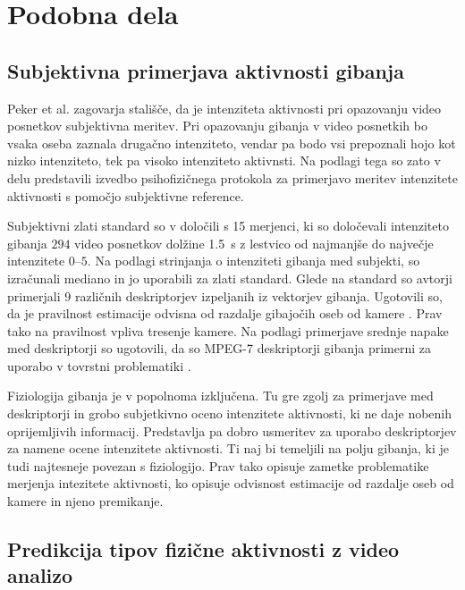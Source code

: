 \section{Podobna dela}\label{sec:podobna-dela}



\subsection{Subjektivna primerjava aktivnosti gibanja}\label{sec:subjektivna-primerjava}

Peker et al. \cite{peker2004framework} zagovarja stališče, da je intenziteta aktivnosti pri opazovanju video posnetkov subjektivna meritev. Pri opazovanju gibanja v video posnetkih bo vsaka oseba zaznala drugačno intenziteto, vendar pa bodo vsi prepoznali hojo kot nizko intenziteto, tek pa visoko intenziteto aktivnsti. Na podlagi tega so zato v delu \cite{peker2004framework} predstavili izvedbo psihofizičnega protokola za primerjavo meritev intenzitete aktivnosti s pomočjo subjektivne reference.

Subjektivni zlati standard so v \cite{peker2004framework} določili s 15 merjenci, ki so določevali intenziteto gibanja $294$ video posnetkov dolžine \SI{1.5}{\s} z lestvico od najmanjše do največje intenzitete $0$--$5$. Na podlagi strinjanja o intenziteti gibanja med subjekti, so izračunali mediano in jo uporabili za zlati standard. Glede na standard so avtorji \cite{peker2004framework} primerjali $9$ različnih deskriptorjev izpeljanih iz vektorjev gibanja. Ugotovili so, da je pravilnost estimacije odvisna od razdalje gibajočih oseb od kamere \cite{peker2004framework}. Prav tako na pravilnost vpliva tresenje kamere. Na podlagi primerjave srednje napake med deskriptorji so ugotovili, da so MPEG-7 deskriptorji gibanja primerni za uporabo v tovrstni problematiki \cite{peker2004framework}.

Fiziologija gibanja je v \cite{peker2004framework} popolnoma izključena. Tu gre zgolj za primerjave med deskriptorji in grobo subjetkivno oceno intenzitete aktivnosti, ki ne daje nobenih oprijemljivih informacij. Predstavlja pa dobro usmeritev za uporabo deskriptorjev za namene ocene intenzitete aktivnosti. Ti naj bi temeljili na polju gibanja, ki je tudi najtesneje povezan s fiziologijo. Prav tako opisuje zametke problematike merjenja intezitete aktivnosti, ko opisuje odvisnost estimacije od razdalje oseb od kamere in njeno premikanje.




\subsection{Predikcija tipov fizične aktivnosti z video analizo}

